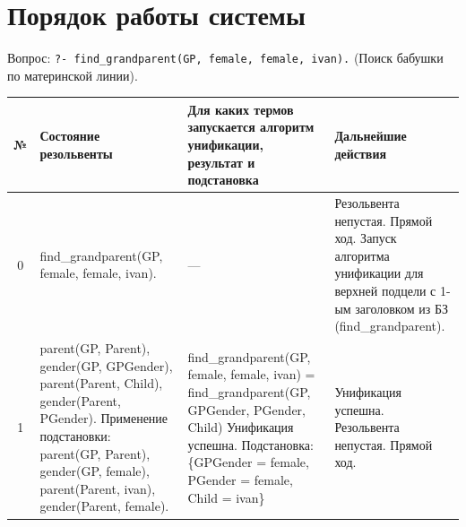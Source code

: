 \clearpage

\section{Порядок работы системы}

Вопрос: \texttt{?- find\_grandparent(GP, female, female, ivan).} (Поиск бабушки по материнской линии).

\begin{tabularx}{\textwidth}{|c|>{\small}X|>{\small}X|>{\small}X|}
	\hline
	\textbf{№}                                                                         &
	\textbf{Состояние резольвенты}                                                     &
	\textbf{Для каких термов запускается алгоритм унификации, результат и подстановка} &
	\textbf{Дальнейшие действия}                                                                 \\
	\hline

	0                                                                                  &
	find\_grandparent(GP, female, female, ivan).                                       &
	—                                                                                  &
	Резольвента непустая. \newline
	Прямой ход. \newline
	Запуск алгоритма унификации для верхней подцели с 1-ым заголовком из БЗ (find\_grandparent). \\
	\hline

	1                                                                                  &
	parent(GP, Parent), \newline
	gender(GP, GPGender), \newline
	parent(Parent, Child), \newline
	gender(Parent, PGender). \newline
	Применение подстановки: \newline
	parent(GP, Parent), \newline
	gender(GP, female), \newline
	parent(Parent, ivan), \newline
	gender(Parent, female).                                                            &
	find\_grandparent(GP, female, female, ivan) =
	find\_grandparent(GP, GPGender, PGender, Child) \newline
	Унификация успешна. \newline
	Подстановка: \newline
	\{GPGender = female, \newline PGender = female, \newline Child = ivan\}            &
	Унификация успешна. \newline
	Резольвента непустая. \newline
	Прямой ход.                                                                                  \\
	\hline


\end{tabularx}
